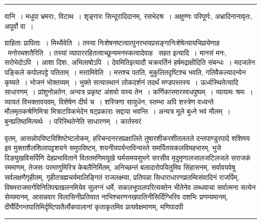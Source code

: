 \documentclass[11pt, openany]{book}
\begin{document}
\vspace{2mm}
\hrule

\noindent
{\s वानि~। मधुपा भ्रमराः, विटाथ~। शृङ्गारः सिन्दूरादिदानम्, रसभेदश्र~। अक्षुण्णः परिपूर्णः, अभ्रादिनानावृतः, अपूर्वो वा~।

ग्राहिताः प्रापिताः~। {\qtt मिथ्यैवेति}~। तस्या निःशेषनष्टत्वात्पुनरभावप्रसङ्गानिःशेषेत्यायभिप्रायेणाह \textendash\ {\qtt मनोरथशतैरिति}~। तस्यां व्यापाररहितत्वाच्छून्यमनस्कत्वादेवाह \textendash\ {\qtt सहत इत्यादि}~। मानसं मनः, सरोभेदोऽपि~। आशा दिशः, अभिलाषोऽपि~। {\qt देवमिति}इत्यादौ चक्रवर्तिनं हर्षमद्राक्षीदिति संबन्धः~। मदजलेन पङ्किले कपोलपट्टे पतिताम्~। {\qtt मत्तामिवेति}~। मत्तश्च पतति, मुकुलितदृष्टिश्च भवति, गतिवैकल्यादन्येन कृष्यते~। भोजनं भोक्तव्यम्~। भुक्ते सत्यास्थानं लोकदर्शनं तदर्थं मण्डपस्तस्य~। ऊर्ध्वस्थितेत्यादि साधारणम्~। प्रांशुनोन्नतेन, अन्यत्र प्रकृष्ट अंशवो यस्य तेन~। कर्णिकारमारस्वधपुष्पम्~। व्यायामः श्रमः~। व्यायतं विभक्तावयवम्, विशेषेण दीर्घ च~। शस्त्रिणा सायुधेन, स्तम्भा अपि शस्त्रेण वध्यन्ते मौलमृतकश्रेणिमित्रा मित्राटविकभेदेन षट्प्रकाराः सद्दाया भवन्ति~। अन्यत्र मूले बुध्ने भवं मौलम्~। बुनप्रतिष्ठमित्यर्थः~। परिस्थितेनेति साधारणम्~। कार्तस्वरं}


\newpage
\lfoot{}

\noindent
वृतम्, आसन्नोपविष्टविशिष्टेष्टलोकम्, हरिचन्दनरसप्रक्षालिते तुषारशीकरशीतलतले दन्तपाण्डुरपादे शशिमय इव मुक्ताशैलशिलापट्टशयने समुपविष्टम्, शयनीयपर्यन्तविन्यस्ते समर्पितसकलविमहभारम्, भुजे दिङ्युखविसर्पिणि देहप्रभाविताने विततमणिमयूखे घर्मसमयसुभगे सरसीव मृदुमृणालजालजटिलजले सराजकं रममाणम्, तेजसः परमाणुमिरित्र केबलैनिर्मितम्, अनिच्छन्तं बलादारोपयितुमिव सिंहासनम्, सर्वावयवेषु सर्वलक्षणैगृहीतम्, गृहीतत्रह्मचर्यमालिङ्गितं राजलक्ष्म्या, प्रतिपन्ना सिधाराधारणव्रतम्विसंवादिनं राजर्पिम्, विषमराजमार्गविनितिपद्मखलनमियेव सुलग्नं धर्मे, सकलभूपालपरित्यक्तेन भीतेनेव लब्धवाचा सर्वात्मना सत्येन सेव्यमानम्, आसन्नवार विलासिनीप्रतियात नाभिश्चरणनखपातिनीसिर्दिग्भिरिव दशभिः प्रणम्यमानम्, दीर्घैर्दिगन्तपातिमिर्दृष्टिपातैर्लोकपालानां कृताकृतमिव प्रत्यवेक्षमाणम्, मणिपादपी\textendash

\vspace{2mm}
\hrule
\end{document}
